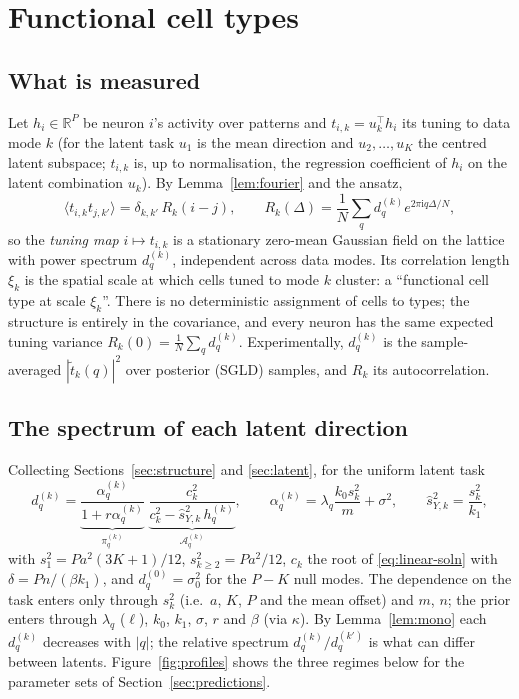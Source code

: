 \documentclass[11pt,a4paper]{article}
\newcommand{\R}{\mathbb R}
\newcommand{\amp}{\mathcal A}
\theoremstyle{remark}
\begin{document}
\section{Functional cell types}
\label{sec:fct}

\subsection{What is measured}
\label{sec:measure}
Let $h_i\in\R^P$ be neuron $i$'s activity over patterns and $t_{i,k} = u_k^\top h_i$ its tuning to data mode $k$ (for the latent task $u_1$ is the mean direction and $u_2,\dots,u_K$ the centred latent subspace; $t_{i,k}$ is, up to normalisation, the regression coefficient of $h_i$ on the latent combination $u_k$). By Lemma~\ref{lem:fourier} and the ansatz,
\begin{equation}
  \langle t_{i,k}t_{j,k'}\rangle = \delta_{k,k'}\,R_k(i-j),\qquad
  R_k(\Delta) = \frac1N\sum_qd_q^{(k)}e^{2\pi\mathrm iq\Delta/N},
  \label{eq:tuning-map}
\end{equation}
so the \emph{tuning map} $i\mapsto t_{i,k}$ is a stationary zero-mean Gaussian field on the lattice with power spectrum $d_q^{(k)}$, independent across data modes. Its correlation length $\xi_k$ is the spatial scale at which cells tuned to mode $k$ cluster: a ``functional cell type at scale $\xi_k$''. There is no deterministic assignment of cells to types; the structure is entirely in the covariance, and every neuron has the same expected tuning variance $R_k(0) = \frac1N\sum_qd_q^{(k)}$. Experimentally, $d_q^{(k)}$ is the sample-averaged $|\tilde t_k(q)|^2$ over posterior (SGLD) samples, and $R_k$ its autocorrelation.

\subsection{The spectrum of each latent direction}
Collecting Sections~\ref{sec:structure} and \ref{sec:latent}, for the uniform latent task
\begin{equation}
  d_q^{(k)} = \underbrace{\frac{\alpha_q^{(k)}}{1 + r\alpha_q^{(k)}}}_{\pi_q^{(k)}}\;
  \underbrace{\frac{c_k^2}{c_k^2 - \hat s_{Y,k}^2\,h_q^{(k)}}}_{\amp_q^{(k)}},\qquad
  \alpha_q^{(k)} = \lambda_q\frac{k_0s_k^2}{m} + \sigma^2,\qquad
  \hat s_{Y,k}^2 = \frac{s_k^2}{k_1},
  \label{eq:dqk}
\end{equation}
with $s_1^2 = Pa^2(3K+1)/12$, $s_{k\ge2}^2 = Pa^2/12$, $c_k$ the root of \eqref{eq:linear-soln} with $\delta = Pn/(\beta k_1)$, and $d_q^{(0)} = \sigma_0^2$ for the $P-K$ null modes. The dependence on the task enters only through $s_k^2$ (i.e.\ $a$, $K$, $P$ and the mean offset) and $m$, $n$; the prior enters through $\lambda_q$ ($\ell$), $k_0$, $k_1$, $\sigma$, $r$ and $\beta$ (via $\kappa$). By Lemma~\ref{lem:mono} each $d_q^{(k)}$ decreases with $|q|$; the relative spectrum $d_q^{(k)}/d_q^{(k')}$ is what can differ between latents. Figure~\ref{fig:profiles} shows the three regimes below for the parameter sets of Section~\ref{sec:predictions}.
\end{document}
